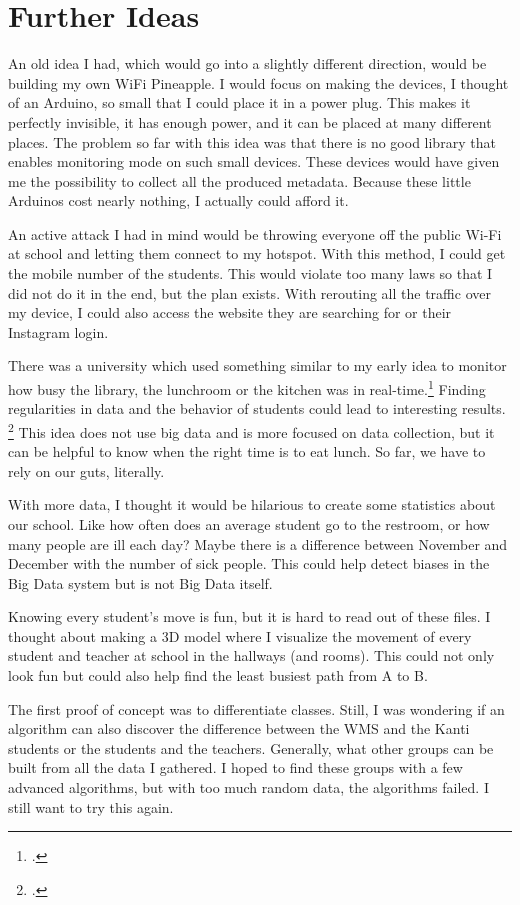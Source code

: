 \documentclass[paper=a4, fontsize=11pt]{article}
\begin{document}
\section{Further Ideas}
An old idea I had, which would go into a slightly different direction, would be building my own WiFi Pineapple. I would focus on making the devices, I thought of an Arduino, so small that I could place it in a power plug. This makes it perfectly invisible, it has enough power, and it can be placed at many different places. The problem so far with this idea was that there is no good library that enables monitoring mode on such small devices. These devices would have given me the possibility to collect all the produced metadata. Because these little Arduinos cost nearly nothing, I actually could afford it.

An active attack I had in mind would be throwing everyone off the public Wi-Fi at school and letting them connect to my hotspot. With this method, I could get the mobile number of the students. This would violate too many laws so that I did not do it in the end, but the plan exists. With rerouting all the traffic over my device, I could also access the website they are searching for or their Instagram login.


There was a university which used something similar to my early idea to monitor how busy the library, the lunchroom or the kitchen was in real-time.\footcite{waitz}
Finding regularities in data and the behavior of students could lead to interesting results. \footcite{deanonymisationmac}
This idea does not use big data and is more focused on data collection, but it can be helpful to know when the right time is to eat lunch. So far, we have to rely on our guts, literally.

With more data, I thought it would be hilarious to create some statistics about our school. Like how often does an average student go to the restroom, or how many people are ill each day? Maybe there is a difference between November and December with the number of sick people. This could help detect biases in the Big Data system but is not Big Data itself.


Knowing every student's move is fun, but it is hard to read out of these files. I thought about making a 3D model where I visualize the movement of every student and teacher at school in the hallways (and rooms). This could not only look fun but could also help find the least busiest path from A to B.

The first proof of concept was to differentiate classes. Still, I was wondering if an algorithm can also discover the difference between the WMS and the Kanti students or the students and the teachers. Generally, what other groups can be built from all the data I gathered. I hoped to find these groups with a few advanced algorithms, but with too much random data, the algorithms failed. I still want to try this again.
\end{document}
